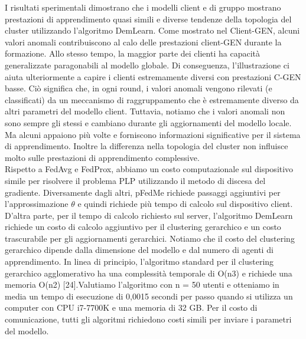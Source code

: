 I risultati sperimentali dimostrano che i modelli client e di gruppo mostrano prestazioni di apprendimento quasi simili e diverse tendenze della topologia del cluster utilizzando l'algoritmo DemLearn. Come mostrato nel Client-GEN, alcuni valori anomali contribuiscono al calo delle prestazioni client-GEN durante la formazione. Allo stesso tempo, la maggior parte dei clienti ha capacità generalizzate paragonabili al modello globale. Di conseguenza, l'illustrazione ci aiuta ulteriormente a capire i clienti estremamente diversi con prestazioni C-GEN basse. Ciò significa che, in ogni round, i valori anomali vengono rilevati (e classificati) da un meccanismo di raggruppamento che è estremamente diverso da altri parametri del modello client. Tuttavia, notiamo che i valori anomali non sono sempre gli stessi e cambiano durante gli aggiornamenti del modello locale. Ma alcuni appaiono più volte e forniscono informazioni significative per il sistema di apprendimento. Inoltre la differenza nella topologia del cluster non influisce molto sulle prestazioni di apprendimento complessive.\\
Rispetto a FedAvg e FedProx, abbiamo un costo computazionale sul dispositivo simile per risolvere il problema PLP utilizzando il metodo di discesa del gradiente. Diversamente dagli altri, pFedMe richiede passaggi aggiuntivi per l'approssimazione $\theta$ e quindi richiede più tempo di calcolo sul dispositivo client. D'altra parte, per il tempo di calcolo richiesto sul server, l'algoritmo DemLearn richiede un costo di calcolo aggiuntivo per il clustering gerarchico e un costo trascurabile per gli aggiornamenti gerarchici. Notiamo che il costo del clustering gerarchico dipende dalla dimensione del modello e dal numero di agenti di apprendimento. In linea di principio, l'algoritmo standard per il clustering gerarchico agglomerativo ha una complessità temporale di O(n3) e richiede una memoria O(n2) [24].Valutiamo l'algoritmo con n = 50 utenti e otteniamo in media un tempo di esecuzione di 0,0015 secondi per passo quando si utilizza un computer con CPU i7-7700K e una memoria di 32 GB. Per il costo di comunicazione, tutti gli algoritmi richiedono costi simili per inviare i parametri del modello.\\
